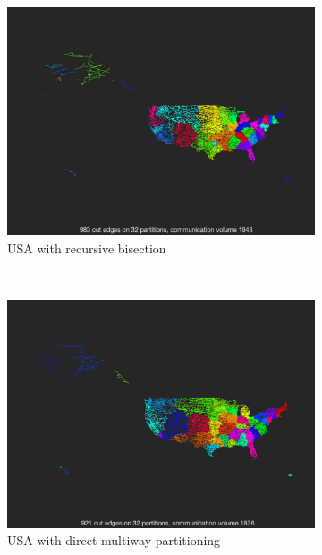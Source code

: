 \begin{figure}[H]
	\centering
	\begin{subfigure}{0.5\textwidth}
		\includegraphics[width=\textwidth]{./media/usa_metis.png}
		\caption{USA with recursive bisection}
		\label{fig:usa_metis}
	\end{subfigure}%
	~
	\begin{subfigure}{0.5\textwidth}
		\includegraphics[width=\textwidth]{./media/usa_metis_k.png}
		\caption{USA with direct multiway partitioning}
		\label{fig:usa_metis_k}
	\end{subfigure}\\
	\begin{subfigure}{0.5\textwidth}

\end{subfigure}
\end{figure}
